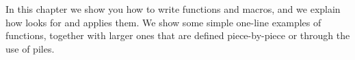 
%
%
%
%
%



In this chapter we show you how to write functions and macros,
and we explain how \Language{} looks for and applies them.
We show some simple one-line examples of functions, together
with larger ones that are defined piece-by-piece or through the use of
piles.



